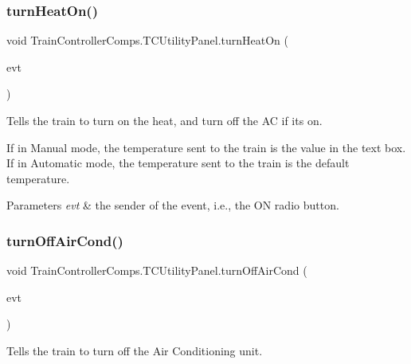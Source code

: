 \subsubsection{\texorpdfstring{turn\+Heat\+On()}{turnHeatOn()}}
{\footnotesize\ttfamily void Train\+Controller\+Comps.\+T\+C\+Utility\+Panel.\+turn\+Heat\+On (\begin{DoxyParamCaption}\item[{java.\+awt.\+event.\+Item\+Event}]{evt }\end{DoxyParamCaption})\hspace{0.3cm}{\ttfamily [private]}}



Tells the train to turn on the heat, and turn off the AC if it\textquotesingle{}s on. 

If in Manual mode, the temperature sent to the train is the value in the text box. If in Automatic mode, the temperature sent to the train is the default temperature.


\begin{DoxyParams}{Parameters}
{\em evt} & the sender of the event, i.\+e., the \textquotesingle{}ON\textquotesingle{} radio button. \\
\hline
\end{DoxyParams}
\mbox{\label{classTrainControllerComps_1_1TCUtilityPanel_aafe79fe4b0c04b2c00e9c7bc0e3f87c1}} 
\subsubsection{\texorpdfstring{turn\+Off\+Air\+Cond()}{turnOffAirCond()}}
{\footnotesize\ttfamily void Train\+Controller\+Comps.\+T\+C\+Utility\+Panel.\+turn\+Off\+Air\+Cond (\begin{DoxyParamCaption}\item[{java.\+awt.\+event.\+Action\+Event}]{evt }\end{DoxyParamCaption})\hspace{0.3cm}{\ttfamily [private]}}



Tells the train to turn off the Air Conditioning unit. 


